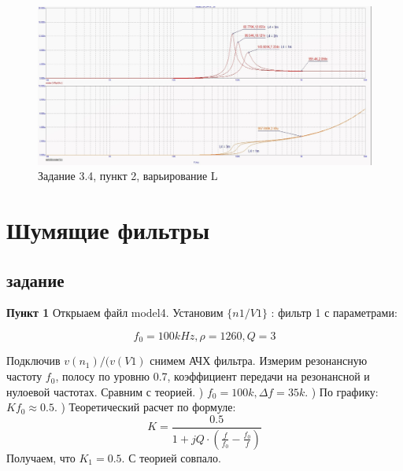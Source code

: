 \documentclass[a4paper, 14pt]{extarticle}%
\begin{document}
\begin{figure}[h!]
			\centering
			\includegraphics[width=1.1\linewidth]{3/3_4_2.jpg}
			\caption{Задание 3.4, пункт 2, варьирование L}
			\label{A}
\end{figure}




\newpage

\section{Шумящие фильтры}

\subsection{задание}
\textbf{Пункт 1}
\newline
Открыаем файл model4.
Установим $\{n1/V1\}$ : фильтр 1 с параметрами:
\newline

\[ f_0 = 100kHz, \rho = 1260, Q = 3\]
\newline

Подключив $v(n_1)/(v(V1)$ снимем АЧХ фильтра. Измерим резонансную частоту $f_0$, полосу по уровню 0.7, коэффициент передачи на резонансной и нулоевой частотах. 
\newline
Сравним с теорией.
) $f_0 = 100k, \Delta f = 35k$.
) По графику:$K{f_0} \approx 0.5$.
) Теоретический расчет по формуле:
\newline
\[ K = \frac{0.5}{1 + jQ\cdot(\frac{f}{f_0} - \frac{f_0}{f})}\]
\newline
Получаем, что $K_1 = 0.5$.
\newline
С теорией совпало.
\end{document}

